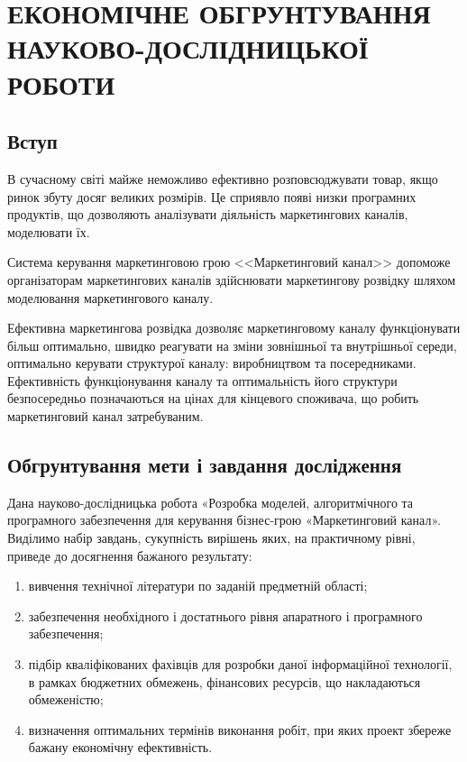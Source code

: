 ﻿\section{ЕКОНОМІЧНЕ ОБГРУНТУВАННЯ НАУКОВО-ДОСЛІДНИЦЬКОЇ РОБОТИ}
    \subsection{Вступ}

В сучасному світі майже неможливо ефективно розповсюджувати товар, якщо ринок збуту досяг великих розмірів. Це сприявло появі низки програмних продуктів, що дозволяють аналізувати діяльність маркетингових каналів, моделювати їх.

Система керування маркетинговою грою <<Маркетинговий канал>> допоможе організаторам маркетингових каналів здійснювати маркетингову розвідку шляхом моделювання маркетингового каналу. 

Ефективна маркетингова розвідка дозволяє маркетинговому каналу функціонувати більш оптимально, швидко реагувати на зміни зовнішньої та внутрішньої середи, оптимально керувати структурої каналу: виробництвом та посередниками. Ефективність функціонування каналу та оптимальність його структури безпосередньо позначаються на цінах для кінцевого споживача, що робить маркетинговий канал затребуваним.

\subsection{Обгрунтування мети і завдання дослідження}
Дана науково-дослідницька робота «Розробка моделей, алгоритмічного та програмного забезпечення для керування бізнес-грою «Маркетинговий канал».
Виділимо набір завдань, сукупність вирішень яких, на практичному рівні, приведе до досягнення бажаного результату:

\begin{enumerate}
\item вивчення технічної літератури по заданій предметній області;
\item забезпечення необхідного і достатнього рівня апаратного і програмного забезпечення;
\item підбір кваліфікованих фахівців для розробки даної інформаційної технології, в рамках бюджетних обмежень, фінансових ресурсів, що накладаються обмеженістю;
\item визначення оптимальних термінів виконання робіт, при яких проект збереже бажану економічну ефективність.
\end{enumerate}

